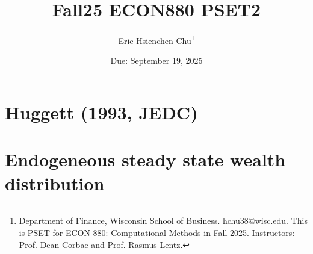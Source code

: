 \documentclass[12pt]{article}
\title{\huge Fall25 ECON880 PSET2}
\author{\Large Eric Hsienchen Chu\footnote{Department of Finance, Wisconsin School of Business. 
\href{mailto:hchu38@wisc.edu}{hchu38@wisc.edu}. 
This is PSET for ECON 880: Computational Methods in Fall 2025. 
Instructors: Prof. Dean Corbae and Prof. Rasmus Lentz.}}
\numberwithin{equation}{section}
\begin{document}
\date{\Large Due: September 19, 2025}
\maketitle
\renewcommand{\cftdot}{.}


\vspace{-4ex}

\section{Huggett (1993, JEDC)}



\section{Endogeneous steady state wealth distribution}




\newpage
\printbibliography
\end{document}
